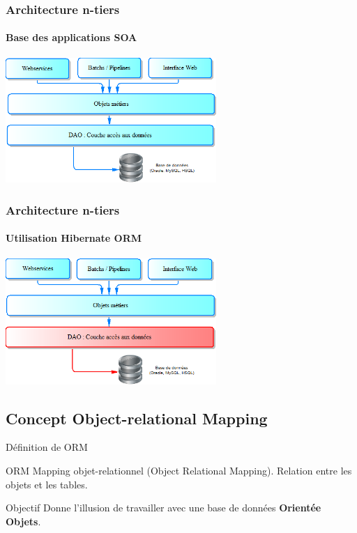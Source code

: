 \documentclass[compact]{beamer}%
\begin{document}
\begin{frame}
	\frametitle{Architecture n-tiers}
	\framesubtitle{Base des applications SOA}
	
	\begin{center}	
	\includegraphics[width=8cm]{images/arch_n_tiers_all.png}
	\end{center}
	\end{frame}

	\begin{frame}
	\frametitle{Architecture n-tiers}
	\framesubtitle{Utilisation Hibernate ORM}
	
	\begin{center}	
	\includegraphics[width=8cm]{images/arch_n_tiers_hibernate.png}
	\end{center}
\end{frame}
	
	
\subsection{Concept Object-relational Mapping}	
		
\begin{frame}{Définition de ORM}
	
	\begin{block}{ORM}
	Mapping objet-relationnel (Object Relational Mapping). Relation entre les objets et les tables.
	\end{block}

	\pause
	\begin{block}{Objectif}	
	Donne l'illusion de travailler avec une base de données \textbf{Orientée Objets}.
	\end{block}
	
\end{frame}
		
\end{document}
